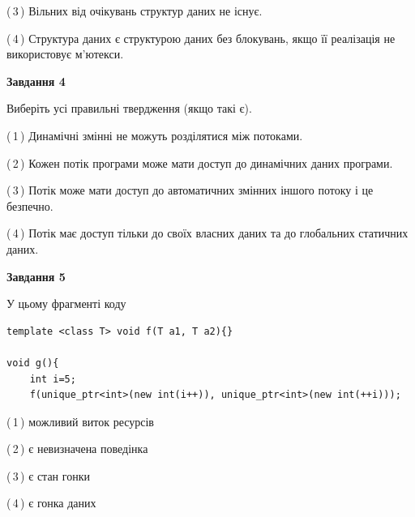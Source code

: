 \documentclass[12pt, ukrainian]{article}
\begin{document}
\begin {large}
{(\,3\,) Вільних від очікувань структур даних не існує.%

(\,4\,) Структура даних є структурою даних без блокувань, якщо її реалізація не використовує м’ютекси.%



\begin{center}
\textbf{Завдання 4}
\end{center}
Виберіть усі правильні твердження (якщо такі є).\par
\vspace{2mm}

(\,1\,) Динамічні змінні не можуть розділятися між потоками.%

(\,2\,) Кожен потік програми може мати доступ до динамічних даних програми.%

(\,3\,) Потік може мати доступ до автоматичних змінних іншого потоку і це безпечно.%

(\,4\,) Потік має доступ тільки до своїх власних даних та до глобальних статичних даних.%



\begin{center}
\textbf{Завдання 5}
\end{center}
У цьому фрагменті коду
\begin{verbatim}
template <class T> void f(T a1, T a2){}

void g(){
    int i=5;
    f(unique_ptr<int>(new int(i++)), unique_ptr<int>(new int(++i)));
\end{verbatim}

(\,1\,) можливий виток ресурсів%

(\,2\,) є невизначена поведінка%

(\,3\,) є стан гонки%

(\,4\,) є гонка даних%


}
\end {large}
\end{document}
